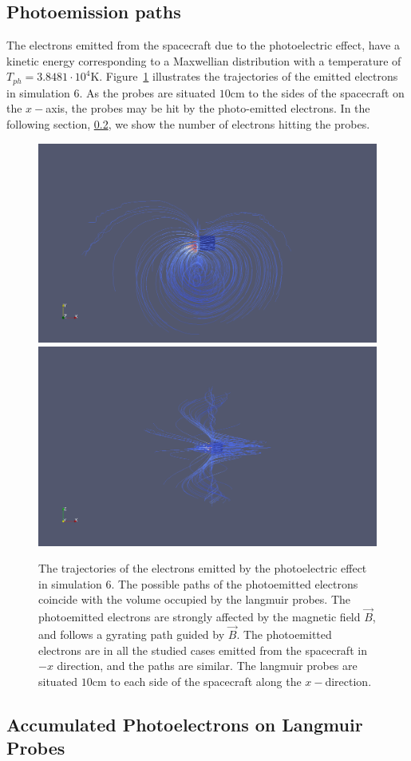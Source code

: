 \subsection{Photoemission paths}

	The electrons emitted from the spacecraft due to the photoelectric effect, have a kinetic
	energy corresponding to a Maxwellian distribution with a temperature of \(T_{ph} =  3.8481\cdot 10^{4} \text{K}\).
	Figure~\ref{fig:trajectories} illustrates the trajectories of the emitted electrons in simulation \(6\).
	As the probes are situated \(10 \text{cm}\) to the sides of the spacecraft on the \(x-\)axis, the probes
	may be hit by the photo-emitted electrons. In the following section, \ref{sec:acc_emitted}, we show the number of electrons hitting
	the probes.


	\begin{figure}
		\includegraphics[width = 0.49 \textwidth]{images/case6_jph_paths}
		\includegraphics[width = 0.49 \textwidth]{images/case6_jph_paths_2}
		\caption{The trajectories of the electrons emitted by the photoelectric effect in simulation \(6\). The possible
		paths of the photoemitted electrons coincide with the volume occupied by the langmuir probes. The photoemitted electrons are strongly affected by the magnetic
		field \(\vec{B}\), and follows a gyrating path guided by \(\vec{B}\). The photoemitted electrons are in all the studied cases
		emitted from the spacecraft in \(-x\) direction, and the paths are similar. The langmuir probes are situated \(10 \text{cm}\) to each side
		of the spacecraft along the \(x-\)direction.}
		\label{fig:trajectories}
	\end{figure}

\subsection{Accumulated Photoelectrons on Langmuir Probes}
\label{sec:acc_emitted}

